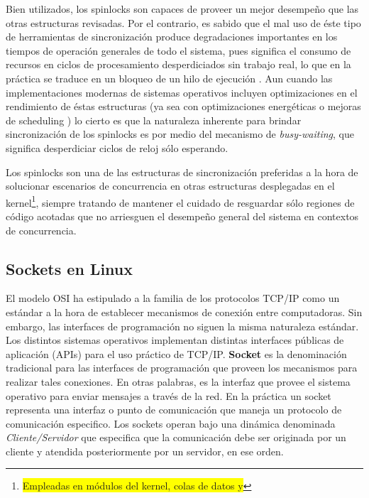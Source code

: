 Bien utilizados, los spinlocks son capaces de proveer un mejor desempeño que las otras estructuras revisadas. Por el contrario, es sabido que el mal uso de éste tipo de herramientas de sincronización produce degradaciones importantes en los tiempos de operación generales de todo el sistema, pues significa el consumo de recursos en ciclos de procesamiento desperdiciados sin trabajo real, lo que en la práctica se traduce en un bloqueo de un hilo de ejecución \cite{paper:nonscalablelocks, paper:cachebouncing}. Aun cuando las implementaciones modernas de sistemas operativos incluyen optimizaciones en el rendimiento de éstas estructuras (ya sea con optimizaciones energéticas o mejoras de scheduling \cite{paper:cacheaffinity}) lo cierto es que la naturaleza inherente para brindar sincronización de los spinlocks es por medio del mecanismo de \emph{busy-waiting}, que significa desperdiciar ciclos de reloj sólo esperando.

Los spinlocks son una de las estructuras de sincronización preferidas a la hora de solucionar escenarios de concurrencia en otras estructuras desplegadas en el kernel\footnote{\colorbox{yellow}{Empleadas en módulos del kernel, colas de datos y}}, siempre tratando de mantener el cuidado de resguardar sólo regiones de código acotadas que no arriesguen el desempeño general del sistema en contextos de concurrencia.


\subsection{Sockets en Linux}
El modelo OSI ha estipulado a la familia de los protocolos TCP/IP como un estándar a la hora de establecer mecanismos de conexión entre computadoras. Sin embargo, las interfaces de programación no siguen la misma naturaleza estándar. Los distintos sistemas operativos implementan distintas interfaces públicas de aplicación (APIs) para el uso práctico de TCP/IP. \textbf{Socket} es la denominación tradicional para las interfaces de programación que proveen los mecanismos para realizar tales conexiones. En otras palabras, es la interfaz que provee el sistema operativo para enviar mensajes a través de la red. En la práctica un socket representa una interfaz o punto de comunicación que maneja un protocolo de comunicación especifico. Los sockets operan bajo una dinámica denominada \emph{Cliente/Servidor} que especifica que la comunicación debe ser originada por un cliente y atendida posteriormente por un servidor, en ese orden.

